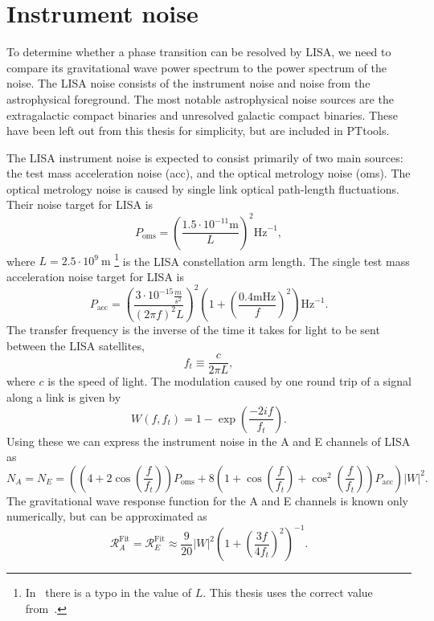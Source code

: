 \section{Instrument noise}
\label{noise}
To determine whether a phase transition can be resolved by LISA,
we need to compare its gravitational wave power spectrum to the power spectrum of the noise.
The LISA noise consists of the instrument noise and noise from the astrophysical foreground.
The most notable astrophysical noise sources are the extragalactic compact binaries and unresolved galactic compact binaries.
These have been left out from this thesis for simplicity, but are included in PTtools.
\cites{gowling_lisa_2021}{pttools}

The LISA instrument noise is expected to consist primarily of two main sources:
the test mass acceleration noise (acc), and the optical metrology noise (oms).
The optical metrology noise is caused by single link optical path-length fluctuations.
Their noise target for LISA is
\cites[eq. 3.2]{gowling_lisa_2021}[eq. 54]{smith_lisa_2019}
\begin{equation}
P_\text{oms} = \left( \frac{1.5 \cdot 10^{-11} \text{m}}{L} \right)^2 \text{Hz}^{-1},
\end{equation}
where $L = 2.5 \cdot 10^9 \ \text{m}$%
\footnote{In~\cite[p. 12]{gowling_lisa_2021} there is a typo in the value of $L$. This thesis uses the correct value from~\cite{smith_lisa_2019}.}
is the LISA constellation arm length.
The single test mass acceleration noise target for LISA is
\cites[eq. 3.3]{gowling_lisa_2021}[eq. 52-53]{smith_lisa_2019}
\begin{equation}
P_\text{acc} = \left( \frac{3 \cdot 10^{-15} \frac{m}{s^2}}{(2\pi f)^2 L} \right)^2 \left( 1 + \left( \frac{0.4 \text{mHz}}{f} \right)^2 \right) \text{Hz}^{-1}.
\end{equation}
The transfer frequency is the inverse of the time it takes for light to be sent between the LISA satellites,
\begin{equation}
f_t \equiv \frac{c}{2 \pi L},
\end{equation}
where $c$ is the speed of light.
The modulation caused by one round trip of a signal along a link is given by
\cite[p. 12]{gowling_lisa_2021}
\begin{equation}
W(f,f_t) = 1 - \exp \left( \frac{-2if}{f_t} \right).
\end{equation}
Using these we can express the instrument noise in the A and E channels of LISA as
\cites[eq. 3.4]{gowling_lisa_2021}[eq. 57]{smith_lisa_2019}
\begin{equation}
N_A = N_E = \left(
\left(4 + 2 \cos \left( \frac{f}{f_t} \right) \right) P_\text{oms} +
8 \left( 1 + \cos \left( \frac{f}{f_t} \right) + \cos^2 \left( \frac{f}{f_t} \right) \right) P_\text{acc}
\right) |W|^2.
\end{equation}
The gravitational wave response function for the A and E channels is known only numerically, but can be approximated as
\cites[eq. 3.6]{gowling_lisa_2021}[eq. 32]{smith_lisa_2019}
\begin{equation}
\mathcal{R}_A^\text{Fit} = \mathcal{R}_E^\text{Fit} \approx \frac{9}{20} |W|^2 \left( 1 + \left( \frac{3f}{4f_t} \right)^2 \right)^{-1}.
\end{equation}

